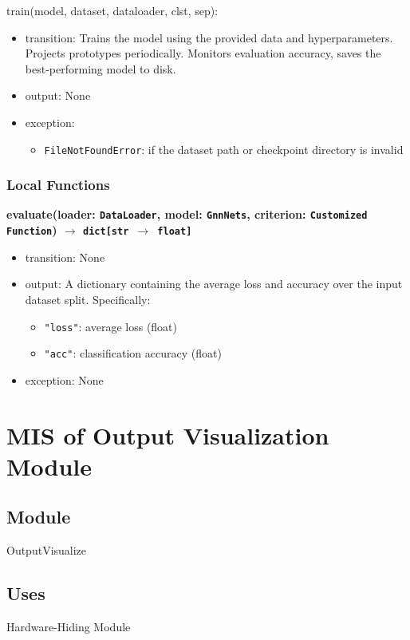 \documentclass[12pt, titlepage]{article}
\begin{document}
\noindent train(model, dataset, dataloader, clst, sep):
\begin{itemize}
\item transition: Trains the model using the provided data and hyperparameters. Projects prototypes periodically. Monitors evaluation accuracy, saves the best-performing model to disk.
\item output: None
\item exception:     
    \begin{itemize}
        \item \texttt{FileNotFoundError}: if the dataset path or checkpoint directory is invalid
    \end{itemize}
\end{itemize}

\subsubsection{Local Functions}

\noindent
\textbf{evaluate(loader: \texttt{DataLoader}, model: \texttt{GnnNets}, criterion: \texttt{Customized Function}) \(\rightarrow\) \texttt{dict[str \(\rightarrow\) float]}}
\begin{itemize}
  \item transition: None
  \item output: A dictionary containing the average loss and accuracy over the input dataset split. Specifically:
    \begin{itemize}
      \item \texttt{"loss"}: average loss (float)
      \item \texttt{"acc"}: classification accuracy (float)
    \end{itemize}
  \item exception: None
\end{itemize}






\section{MIS of Output Visualization Module} \label{OutputVisualization}

\subsection{Module}
OutputVisualize

\subsection{Uses}
Hardware-Hiding Module
\end{document}
